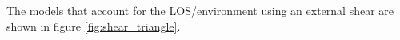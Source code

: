 The models that account for the LOS/environment using an external shear are shown in figure \ref{fig:shear_triangle}. 